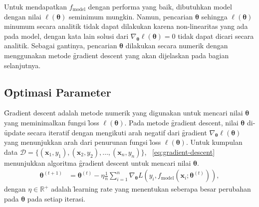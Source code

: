     Untuk mendapatkan $f_\text{model}$ dengan performa yang baik, dibutuhkan model dengan nilai $\ell(\bm{\theta})$ seminimum mungkin. Namun, pencarian $\bm{\theta}$ sehingga $ \ell (\bm{\theta})$ minumum secara analitik tidak dapat dilakukan karena non-linearitas yang ada pada model, dengan kata lain solusi dari $\nabla_{\bm{\theta}} \ell(\bm{\theta}) = 0$ tidak dapat dicari secara analitik. Sebagai gantinya, pencarian $\bm{\theta}$ dilakukan secara numerik dengan menggunakan metode \f{gradient descent} yang akan dijelaskan pada bagian selanjutnya.
    
\subsection{\f{Optimasi} Parameter}

    \f{Gradient descent} adalah metode numerik yang digunakan untuk mencari nilai $\bm{\theta}$ yang meminimalkan fungsi \f{loss} $\ell(\bm{\theta})$. Pada metode \f{gradient descent}, nilai $\bm{\theta}$ di-\f{update} secara iteratif dengan mengikuti arah negatif dari \f{gradient} $\nabla_{\bm{\theta}} \ell(\bm{\theta})$ yang menunjukkan arah dari penurunan fungsi \f{loss} $\ell(\bm{\theta})$. Untuk kumpulan data $\mathcal{D} = \{(\mathbf{x}_1, y_1), (\mathbf{x}_2, y_2), \dots, (\mathbf{x}_n, y_n)\}$, \equ~\ref{eq:gradient-descent} menunjukkan algoritma \f{gradient descent} untuk mencari nilai $\bm{\theta}$.
    \begin{align}
        \label{eq:gradient-descent}
        \bm{\theta}^{(t+1)} &= \bm{\theta}^{(t)} - \eta \frac{1}{n} \sum_{i=1}^{n} \nabla_{\bm{\theta}} L(y_i, f_{\text{model}}(\mathbf{x}_i; \bm{\theta}^{(t)})),
    \end{align}
    dengan $\eta \in \mathbb{R}^+$ adalah \f{learning rate} yang menentukan seberapa besar perubahan pada $\bm{\theta}$ pada setiap iterasi.

